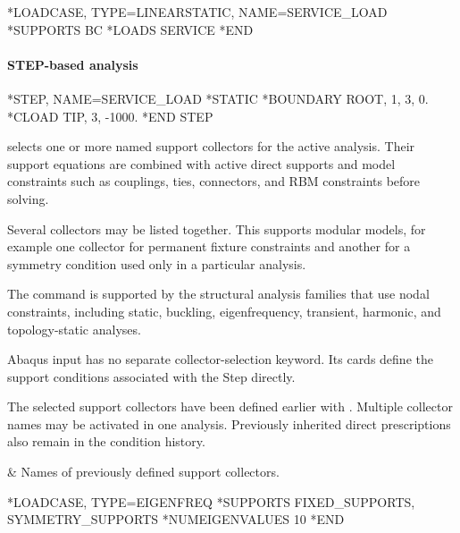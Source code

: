 \exampleheading

\begin{inputdeck}
*LOADCASE, TYPE=LINEARSTATIC,
 NAME=SERVICE_LOAD
*SUPPORTS
BC
*LOADS
SERVICE
*END
\end{inputdeck}

\paragraph*{STEP-based analysis}
\begin{inputdeck}
*STEP, NAME=SERVICE_LOAD
*STATIC
*BOUNDARY
ROOT, 1, 3, 0.
*CLOAD
TIP, 3, -1000.
*END STEP
\end{inputdeck}


 selects one or more named support collectors for the active analysis. Their support equations are combined with active direct supports and model constraints such as couplings, ties, connectors, and RBM constraints before solving.

Several collectors may be listed together. This supports modular models, for example one collector for permanent fixture constraints and another for a symmetry condition used only in a particular analysis.

The command is supported by the structural analysis families that use nodal constraints, including static, buckling, eigenfrequency, transient, harmonic, and topology-static analyses.

Abaqus input has no separate collector-selection keyword. Its  cards define the support conditions associated with the Step directly.

The selected support collectors have been defined earlier with . Multiple collector names may be activated in one analysis. Previously inherited direct  prescriptions also remain in the condition history.

\begin{keyworddata}
 & Names of previously defined support collectors. \\
\end{keyworddata}

\exampleheading

\begin{inputdeck}
*LOADCASE, TYPE=EIGENFREQ
*SUPPORTS
FIXED_SUPPORTS, SYMMETRY_SUPPORTS
*NUMEIGENVALUES
10
*END
\end{inputdeck}

